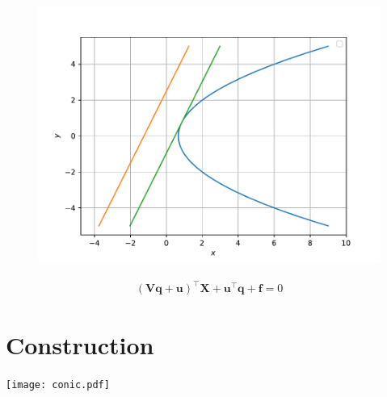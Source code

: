 \documentclass[journal,10pt,twocolumn]{article}
\let\vec\mathbf
\begin{document}
	\begin{figure}[!h]
		\centering
 \includegraphics[width=\columnwidth]{chapters/12/6/3/25/figs/conic.pdf}
		\caption{}
		\label{fig:12/6/3/25}
  	\end{figure}
\iffalse
\begin{center}
\begin{align}
 \vec{(Vq+u)}^{\top}\vec{X}+\vec{u}^{\top}\vec{q}+\vec{f} =0 
\end{align}
\end{center}
\section{ Construction}
\texttt{[image: conic.pdf]} 
\end{document}

